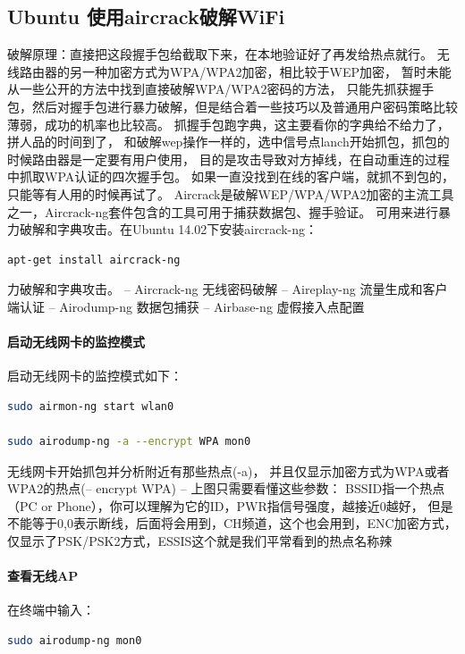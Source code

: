 \documentclass{book}
\begin{document}
\subsection{Ubuntu 使用aircrack破解WiFi}

破解原理：直接把这段握手包给截取下来，在本地验证好了再发给热点就行。
无线路由器的另一种加密方式为WPA/WPA2加密，相比较于WEP加密，
暂时未能从一些公开的方法中找到直接破解WPA/WPA2密码的方法，
只能先抓获握手包，然后对握手包进行暴力破解，但是结合着一些技巧以及普通用户密码策略比较薄弱，成功的机率也比较高。
抓握手包跑字典，这主要看你的字典给不给力了，拼人品的时间到了，
和破解wep操作一样的，选中信号点lanch开始抓包，抓包的时候路由器是一定要有用户使用，
目的是攻击导致对方掉线，在自动重连的过程中抓取WPA认证的四次握手包。
如果一直没找到在线的客户端，就抓不到包的，只能等有人用的时候再试了。
Aircrack是破解WEP/WPA/WPA2加密的主流工具之一，Aircrack-ng套件包含的工具可用于捕获数据包、握手验证。
可用来进行暴力破解和字典攻击。在Ubuntu 14.02下安装aircrack-ng：

\begin{lstlisting}[language=Bash]
apt-get install aircrack-ng
\end{lstlisting}

力破解和字典攻击。
– Aircrack-ng 无线密码破解
– Aireplay-ng 流量生成和客户端认证
– Airodump-ng 数据包捕获
– Airbase-ng  虚假接入点配置

\paragraph{启动无线网卡的监控模式}
启动无线网卡的监控模式如下：

\begin{lstlisting}[language=Bash]
sudo airmon-ng start wlan0

sudo airodump-ng -a --encrypt WPA mon0
\end{lstlisting}

无线网卡开始抓包并分析附近有那些热点(-a)，
并且仅显示加密方式为WPA或者WPA2的热点(-- encrypt WPA) – 上图只需要看懂这些参数：
BSSID指一个热点（PC or Phone），你可以理解为它的ID，PWR指信号强度，越接近0越好，
但是不能等于0,0表示断线，后面将会用到，CH频道，这个也会用到，ENC加密方式，
仅显示了PSK/PSK2方式，ESSIS这个就是我们平常看到的热点名称辣

\paragraph{查看无线AP}在终端中输入：

\begin{lstlisting}[language=Bash]
sudo airodump-ng mon0
\end{lstlisting}
\end{document}

